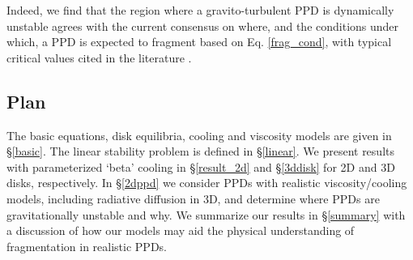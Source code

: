 \documentclass[iop, numberedappendix]{emulateapj}
\begin{document}
Indeed, we find that the region where a gravito-turbulent PPD is
dynamically unstable agrees with the current consensus on  where, and
the conditions under which, a PPD is expected to fragment based on
Eq. \ref{frag_cond}, with typical critical values cited in the
literature \citep[e.g. $\beta_c\sim
  3,\,\alpha_c\sim0.1$;][]{gammie01,rice05}.    
   

\subsection{Plan}

The basic equations, disk equilibria, cooling and viscosity models are 
given in \S\ref{basic}. The linear stability problem is defined in 
\S\ref{linear}. We present results with parameterized `beta' cooling in 
\S\ref{result_2d} and \S\ref{3ddisk} for 2D and 3D disks,
respectively. %
In \S\ref{2dppd} we consider PPDs with realistic viscosity/cooling   
models, including radiative diffusion in 3D, and determine where PPDs
are gravitationally unstable and why. We summarize our results in
\S\ref{summary} with a discussion of how our models may aid the 
physical understanding of fragmentation in realistic PPDs.   





 




\appendix




\end{document}
